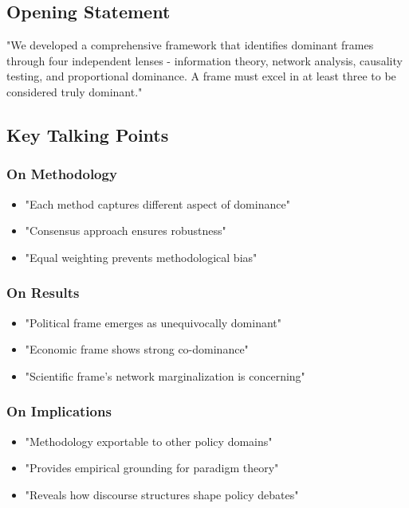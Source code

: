 \documentclass[11pt]{article}
\begin{document}
\subsection{Opening Statement}
"We developed a comprehensive framework that identifies dominant frames through four independent lenses - information theory, network analysis, causality testing, and proportional dominance. A frame must excel in at least three to be considered truly dominant."

\subsection{Key Talking Points}

\subsubsection{On Methodology}
\begin{itemize}
    \item "Each method captures different aspect of dominance"
    \item "Consensus approach ensures robustness"
    \item "Equal weighting prevents methodological bias"
\end{itemize}

\subsubsection{On Results}
\begin{itemize}
    \item "Political frame emerges as unequivocally dominant"
    \item "Economic frame shows strong co-dominance"
    \item "Scientific frame's network marginalization is concerning"
\end{itemize}

\subsubsection{On Implications}
\begin{itemize}
    \item "Methodology exportable to other policy domains"
    \item "Provides empirical grounding for paradigm theory"
    \item "Reveals how discourse structures shape policy debates"
\end{itemize}
\end{document}
